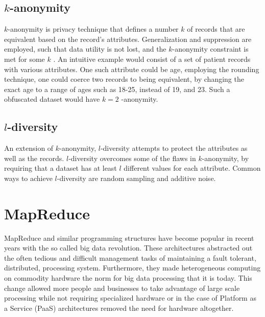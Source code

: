 \subsection{$k$-anonymity}

$k$-anonymity is privacy technique that defines a number $k$ of records that are equivalent based on the record's
attributes.  Generalization and suppression are employed, such that data utility is not lost, and the $k$-anonymity
constraint is met for some $k$ \cite{Aggarwal2008}.  An intuitive example would consist of a set of patient records with
various attributes.  One such attribute could be age, employing the rounding technique, one could coerce two records to
being equivalent, by changing the exact age to a range of ages such as 18-25, instead of 19, and 23.  Such a obfuscated
dataset would have $k=2$ -anonymity.

\subsection{$l$-diversity}

An extension of $k$-anonymity, $l$-diversity attempts to protect the attributes as well as the records.  $l$-diversity
overcomes some of the flaws in $k$-anonymity, by requiring that a dataset has at least $l$ different values for each
attribute.  Common ways to achieve $l$-diversity are random sampling and additive noise.

\section{MapReduce}
MapReduce \cite{dean-08} and similar programming structures have become popular in recent years with the so called big data revolution.
These architectures abstracted out the often tedious and difficult management tasks of maintaining a fault tolerant,
distributed, processing system.  Furthermore, they made heterogeneous computing on commodity hardware the norm for big
data processing that it is today.  This change allowed more people and businesses to take advantage of large scale
processing while not requiring specialized hardware or in the case of Platform as a Service (PaaS) architectures removed
the need for hardware altogether.

